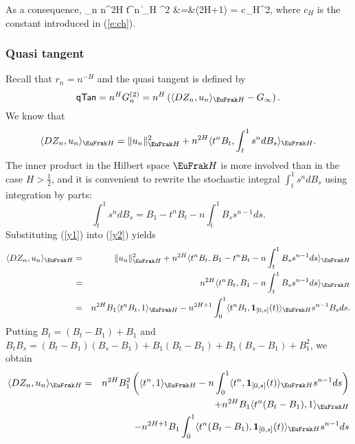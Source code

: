 \documentclass[a4paper]{article}
\numberwithin{equation}{section}
\def\HH{\EuFrak H}
\begin{document}
{ 
 
 As a consequence, 
 \beas 
 \lim_{n\rightarrow \infty} n^{2H}  \| t^n \|_{\HH} ^2 &=&\Gamma(2H+1) = c_H^2,
 \eeas
 where $c_H$ is the constant introduced in (\ref{e:ch}).
  
 
 
 \medskip
 \noindent
\subsubsection{Quasi tangent}\label{170805-7}
Recall  that $r_n= n^{-H}$ and the  quasi tangent is defined by
 \[
{\sf qTan} = n^{H} G^{(2)}_n = n^{H} \left( \langle DZ_n, u_n \rangle_{\HH} - G_{\infty}\right) .
 \]
 We know that
 \begin{equation} \label{y2}
  \langle DZ_n, u_n \rangle_{\HH}= \|u_n \|_{\HH}^2 +  n^{2H} \langle t^n B_t, \int_t^1 s^n dB_s\rangle_{\HH}.
  \end{equation}
  The inner product in the Hilbert space $\HH$ is more involved than in the case $H>\frac 12$, and it is convenient to rewrite the stochastic integral  $ \int_t^1 s^n dB_s$ using integration by parts: %
  \begin{equation}  \label{y1}
   \int_t^1 s^n dB_s=B_1 - t^n B _t -n \int_t^1 B_s s^{n-1} ds.
   \end{equation}
   Substituting (\ref{y1}) into (\ref{y2}) yields
 \begin{eqnarray*}
  \langle DZ_n, u_n \rangle_{\HH} &=& \|u_n \|_{\HH}^2 +  n^{2H} \langle t^n B_t,  B_1 - t^n B _t -n \int_t^1 B_s s^{n-1} ds\rangle_{\HH}\\
  &=&n^{2H} \langle t^n B_t,  B_1  -n \int_t^1 B_s s^{n-1} ds\rangle_{\HH}\\
  &=& n^{2H}B_1 \langle t^n B_t, 1 \rangle_{\HH} - n^{2H+1}\int_0^1 \langle t^n B_t ,\mathbf{1}_{[0,s]}(t) \rangle_{\HH} s^{n-1} B_s ds.
  \end{eqnarray*}
  Putting $B_t= (B_t-B_1) +B_1$ and $B_tB_s= (B_t-B_1)(B_s-B_1)+B_1(B_t-B_1)+ B_1( B_s-B_1)+B_1^2$, we obtain
  \begin{eqnarray*}
   \langle DZ_n, u_n \rangle_{\HH} &=& 
   n^{2H}B_1^2 \left(  \langle t^n, 1 \rangle_{\HH} - n\int_0^1 \langle t^n ,\mathbf{1}_{[0,s]}(t) \rangle_{\HH} s^{n-1}  ds \right) \\
   &&+ n^{2H} B_1 \langle t^n(B_t-B_1), 1 \rangle_{\HH}  \\
   &&- n^{2H+1}B_1\int_0^1 \langle t^n (B_t-B_1) ,\mathbf{1}_{[0,s]}(t) \rangle_{\HH} s^{n-1}   ds \\

\end{eqnarray*}}
\end{document}
